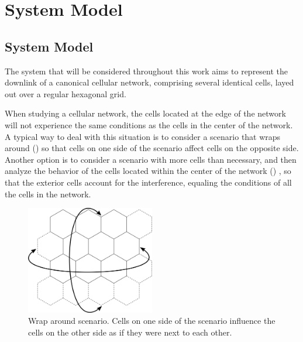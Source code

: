 \chapter{System Model}\label{ch:system_model}

\section{System Model}\label{sec:system_model}
The system that will be considered throughout this work aims to represent the
downlink of a canonical cellular network, comprising several identical cells,
layed out over a regular hexagonal grid.

When studying a cellular network, the cells located at the edge of the network
will not experience the same conditions as the cells in the center of the
network. A typical way to deal with this situation is to consider a scenario
that wraps around () so that cells on one side of the
scenario affect cells on the opposite side. Another option is to consider a
scenario with more cells than necessary, and then analyze the behavior of the
cells located within the center of the network ()
, so that the exterior cells account for the interference, equaling the
conditions of all the cells in the network.

\begin{figure}[t]
   \centering
   \includegraphics[width=0.5\textwidth]{./03.system_model/img/torus_scenario}
   \caption{Wrap around scenario. Cells on one side of the scenario influence
            the cells on the other side as if they were next to each other.}
   \label{fig:torus_scenario}
\end{figure}

